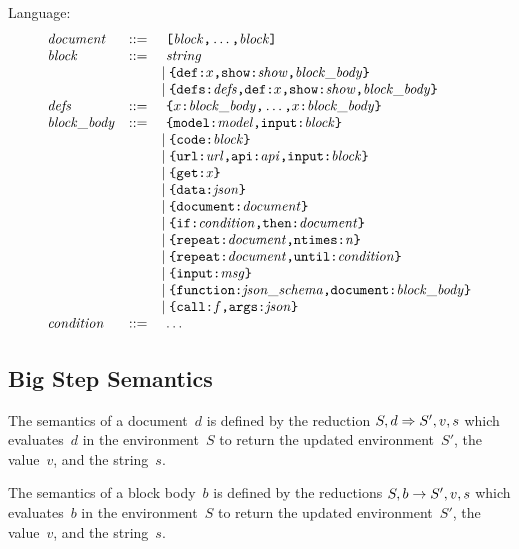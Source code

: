 \documentclass{article}
\begin{document}
Language:
$$
\begin{array}{lcl}
    \mit{document} & ::= &\ 
        \jsarr{\mit{block}\mtt{,} \dots\mtt{,} \mit{block}}
    \\
    \mit{block} & ::= &\
    \mit{string}
    \\ &&\mid
    \pdlblock[\mit{show}]{x}{\mit{block\_body}}
    \\ &&\mid
    \pdlblockdefs{\mit{defs}}{\pdlblockstar[\mit{show}]{x}{\mit{block\_body}}}
    \\
    \mit{defs} & ::= &\
    \jsobj{\pdldef{x}{\mit{block\_body}}\mtt{,} \dots\mtt{,}\pdldef{x}{\mit{block\_body}}}
    \\
    \mit{block\_body} & ::= &\ 
    \pdlmodel{\mit{model}}{\mit{block}}
    \\ &&\mid
    \pdlcode{\mit{block}}
    \\ &&\mid
    \pdlapi{\mit{url}}{\mit{api}}{\mit{block}}
    \\ &&\mid
    \pdlget{\mit{x}}
    \\ &&\mid
    \pdldata{\mit{json}}
    \\ &&\mid
    \pdlsequence{\mit{document}}
    \\ &&\mid
    \pdlif{\mit{condition}}{\mit{document}}
    \\ &&\mid
    \pdlrepeat{\mit{document}}{\mit{n}}
    \\ &&\mid
    \pdlrepeatuntil{\mit{document}}{\mit{condition}}
    \\ &&\mid
    \pdlinput{\mit{msg}}
    \\ &&\mid
    \pdlfunction{\mit{json\_schema}}{\mit{block\_body}}
    \\ &&\mid
    \pdlcall{f}{\mit{json}}
    \\
    \mit{condition} & ::= &\ \dots

\end{array}
$$

\subsection*{Big Step Semantics}

The semantics of a document~$d$ is defined by the reduction ${S}, {d} \Rightarrow {S'}, {v}, {s}$ which evaluates~$d$ in the environment~$S$ to return the updated environment~$S'$, the value~$v$, and the string~$s$.

The semantics of a block body~$b$ is defined by the reductions ${S}, {b} \rightarrow {S'}, {v}, {s}$ which evaluates~$b$ in the environment~$S$ to return the updated environment~$S'$, the value~$v$, and the string~$s$.
\end{document}

